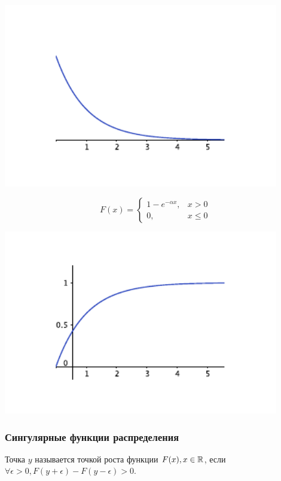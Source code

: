 \begin{itemize}
            \includegraphics[width=12cm]{main-lectures/images/Lec_8_6.pdf}

            \[
                F(x) = \begin{cases}
                    1-e^{-\alpha x}, &x > 0\\
                    0, &x \leq 0
                \end{cases}
            \]

            \includegraphics[width=12cm]{main-lectures/images/Lec_8_7.pdf}
    \end{itemize}

\subsubsection{Сингулярные функции распределения}

\begin{definition}
    Точка $y$ называется точкой роста функции $F(x), x \in \mathbb{R}$, если $\forall \epsilon > 0, F(y+\epsilon) -
    F(y - \epsilon) > 0$.
\end{definition}

